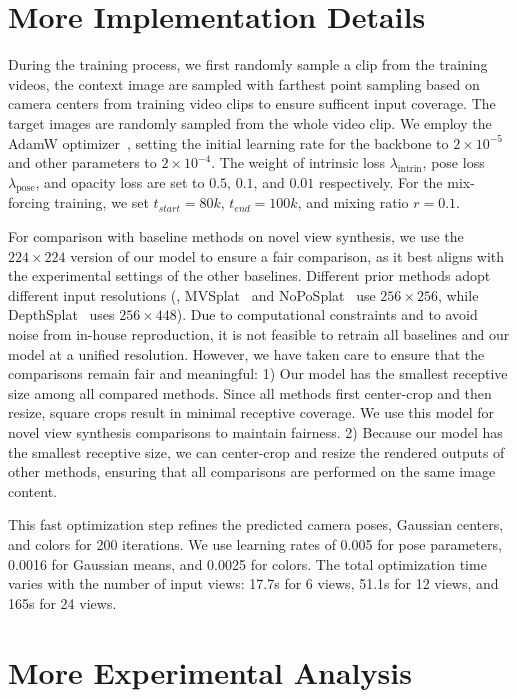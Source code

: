 
\section{More Implementation Details}
During the training process, we first randomly sample a clip from the training videos, the context image are sampled with farthest point sampling based on camera centers from training video clips to ensure sufficent input coverage. The target images are randomly sampled from the whole video clip.
We employ the AdamW optimizer~\citep{adamw}, setting the initial learning rate for the backbone to $2\times10^{-5}$ and other parameters to $2\times10^{-4}$. The weight of intrinsic loss $\lambda_{\text{intrin}}$, pose loss $\lambda_{\text{pose}}$, and opacity loss are set to $0.5$, $0.1$, and $0.01$ respectively.
For the mix-forcing training, we set $t_{start}=80k$, $t_{end}=100k$, and mixing ratio $r=0.1$.

For comparison with baseline methods on novel view synthesis, we use the $224\times224$ version of our model to ensure a fair comparison, as it best aligns with the experimental settings of the other baselines. Different prior methods adopt different input resolutions (\eg, MVSplat~\citep{mvsplat} and NoPoSplat~\cite{mvsplat} use $256\times256$, while DepthSplat~\citep{depthsplat} uses $256\times448$). Due to computational constraints and to avoid noise from in-house reproduction, it is not feasible to retrain all baselines and our model at a unified resolution. However, we have taken care to ensure that the comparisons remain fair and meaningful: 
1) Our model has the smallest receptive size among all compared methods. Since all methods first center-crop and then resize, square crops result in minimal receptive coverage. We use this model for novel view synthesis comparisons to maintain fairness.
2) Because our model has the smallest receptive size, we can center-crop and resize the rendered outputs of other methods, ensuring that all comparisons are performed on the same image content.

This fast optimization step refines the predicted camera poses, Gaussian centers, and colors for 200 iterations. We use learning rates of 0.005 for pose parameters, 0.0016 for Gaussian means, and 0.0025 for colors. The total optimization time varies with the number of input views: 17.7s for 6 views, 51.1s for 12 views, and 165s for 24 views.


\section{More Experimental Analysis}

